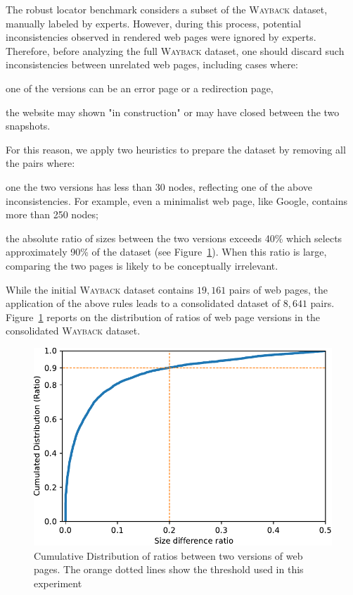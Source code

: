 \vspace{6pt}
The robust locator benchmark considers a subset of the \textsc{Wayback} dataset, manually labeled by experts.
However, during this process, potential inconsistencies observed in rendered web pages were ignored by experts.
% 
Therefore, before analyzing the full \textsc{Wayback} dataset, one should discard such inconsistencies between unrelated web pages, including cases where:
\begin{inparaenum}[\em (a)]
\item one of the versions can be an error page or a redirection page,
\item the website may shown "in construction" or may have closed between the two snapshots.
\end{inparaenum}  
% 
For this reason, we apply two heuristics to prepare the dataset by removing all the pairs where:
\begin{compactenum}
  \item one the two versions has less than 30 nodes, reflecting one of the above inconsistencies.
  For example, even a minimalist web page, like Google, contains more than 250 nodes;
  \item the absolute ratio of sizes between the two versions exceeds 40\% which
  selects approximately 90\% of the dataset (see
  Figure~\ref{fig:sizeDiffRatioDistribution}). When this ratio is large,
  comparing the two pages is likely to be conceptually irrelevant.
\end{compactenum}

While the initial \textsc{Wayback} dataset contains $19,161$ pairs of web pages, the application of the above rules leads to a consolidated dataset of $8,641$ pairs. %
Figure~\ref{fig:sizeDiffRatioDistribution} reports on the distribution of ratios of web page versions in the consolidated \textsc{Wayback} dataset.

\begin{figure}
  \centering
  \includegraphics[width=.8\linewidth]{erratum/sizeDiffRatioDistribution}
  \caption{Cumulative Distribution of ratios between two versions of web pages.
    The orange dotted lines show the threshold used in this experiment}
  \label{fig:sizeDiffRatioDistribution}
\end{figure}


